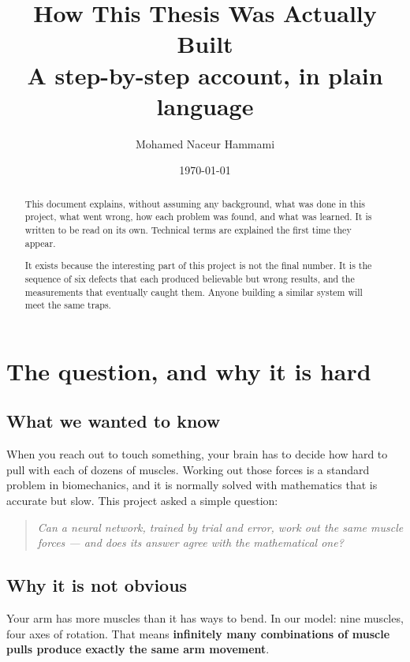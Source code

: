 \documentclass[11pt, a4paper]{article}
\title{\textbf{How This Thesis Was Actually Built}\\[6pt]
       \large A step-by-step account, in plain language}
\author{Mohamed Naceur Hammami}
\date{\today}
\begin{document}
\maketitle

\begin{abstract}
\noindent
This document explains, without assuming any background, what was done in this
project, what went wrong, how each problem was found, and what was learned. It is
written to be read on its own. Technical terms are explained the first time they
appear.

It exists because the interesting part of this project is not the final number.
It is the sequence of six defects that each produced believable but wrong
results, and the measurements that eventually caught them. Anyone building a
similar system will meet the same traps.
\end{abstract}

\tableofcontents
\bigskip

\section{The question, and why it is hard}

\subsection{What we wanted to know}

When you reach out to touch something, your brain has to decide how hard to pull
with each of dozens of muscles. Working out those forces is a standard problem in
biomechanics, and it is normally solved with mathematics that is accurate but
slow. This project asked a simple question:

\begin{quote}
\textit{Can a neural network, trained by trial and error, work out the same
muscle forces --- and does its answer agree with the mathematical one?}
\end{quote}

\subsection{Why it is not obvious}

Your arm has more muscles than it has ways to bend. In our model: nine muscles,
four axes of rotation. That means \textbf{infinitely many combinations of muscle
pulls produce exactly the same arm movement}.
\end{document}
